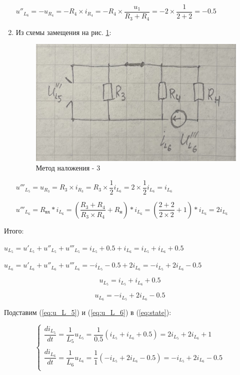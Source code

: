 \begin{enumerate}
    $ u''_{L_6} = 
    - u_{R_4} =  
    - R_4 \times i_{R_4} = 
    - R_4 \times \dfrac{u_1}{R_3 + R_4} = 
    - 2 \times \dfrac{1}{2 + 2} = 
    - 0.5
    $
    
    \item Из схемы замещения на рис. \ref{fig:circ_overlay_3}:
    
    \begin{figure}[H]
        \centering
        \includegraphics[width=0.7\linewidth]{photo/circ_overlay_3}
        \caption{Метод наложения - 3}
        \label{fig:circ_overlay_3}
    \end{figure}
    
    $ u'''_{L_5} = 
    u_{R_3} =
    R_3 \times i_{R_3} =
    R_3 \times \dfrac{1}{2} i_{L_6} =
    2 \times \dfrac{1}{2} i_{L_6} =
    i_{L_6}
    $
    
    $ u'''_{L_6} = 
    R_{вх} * i_{L_6} = 
    (\dfrac{R_3 + R_4}{R_3 \times R_4} + R_н) * i_{L_6} = 
    (\dfrac{2 + 2}{2 \times 2} + 1) * i_{L_6} = 
    2i_{L_6}
    $
\end{enumerate}

Итого:

$ u_{L_5} = 
u'_{L_5} + u''_{L_5} + u'''_{L_5} = 
i_{L_5} + 0.5 + i_{L_6} =
i_{L_5} + i_{L_6} + 0.5 $

$ u_{L_6} = 
u'_{L_6} + u''_{L_6} + u'''_{L_6} = 
- i_{L_5} - 0.5 + 2i_{L_6} =
- i_{L_5} + 2i_{L_6} - 0.5 $

\begin{equation}\label{eq:u_L_5}
u_{L_5} = 
i_{L_5} + i_{L_6} + 0.5
\end{equation}

\begin{equation}\label{eq:u_L_6}
u_{L_6} = 
- i_{L_5} + 2i_{L_6} - 0.5
\end{equation}

Подставим 
(\ref{eq:u_L_5}) и (\ref{eq:u_L_6}) в (\ref{eq:state}):

$$
\begin{cases}
    \dfrac{di_{L_5}}{dt} = \dfrac{1}{L_5} u_{L_5} =
    \dfrac{1}{0.5} (i_{L_5} + i_{L_6} + 0.5) =
    2i_{L_5} + 2i_{L_6} + 1
    \\\\
    \dfrac{di_{L_6}}{dt} = \dfrac{1}{L_6} u_{L_6} =
    \dfrac{1}{1} (- i_{L_5} + 2i_{L_6} - 0.5) =
    - i_{L_5} + 2i_{L_6} - 0.5
    \\
\end{cases}
$$

